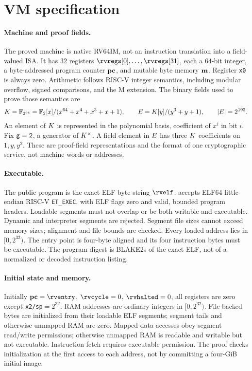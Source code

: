 \section{VM specification}\label{sec:vm}

\paragraph{Machine and proof fields.} The proved machine is native RV64IM, not an instruction translation into a field-valued ISA. It has $32$ registers $\rvregs[0],\ldots,\rvregs[31]$, each a $64$-bit integer, a byte-addressed program counter $\mathbf{pc}$, and mutable byte memory $\mathbf{m}$. Register \texttt{x0} is always zero. Arithmetic follows RISC-V integer semantics, including modular overflow, signed comparisons, and the M extension. The binary fields used to prove those semantics are
\[
  K=\mathbb{F}_{2^{64}}=\mathbb{F}_2[x]/(x^{64}+x^4+x^3+x+1),
  \qquad E=K[y]/(y^3+y+1),\qquad |E|=2^{192}.
\]
An element of $K$ is represented in the polynomial basis, coefficient of $x^i$ in bit $i$. Fix $\mathsf{g}=\mathtt{2}$, a generator of $K^\times$. A field element in $E$ has three $K$ coefficients on $1,y,y^2$. These are proof-field representations and the format of one cryptographic service, not machine words or addresses.

\paragraph{Executable.} The public program is the exact ELF byte string $\rvelf$.  accepts ELF64 little-endian RISC-V \texttt{ET\_EXEC}, with ELF flags zero and valid, bounded program headers. Loadable segments must not overlap or be both writable and executable. Dynamic and interpreter segments are rejected. Segment file sizes cannot exceed memory sizes; alignment and file bounds are checked. Every loaded address lies in $[0,2^{32})$. The entry point is four-byte aligned and its four instruction bytes must be executable. The program digest is BLAKE2s of the exact ELF, not of a normalized or decoded instruction listing.

\paragraph{Initial state and memory.} Initially $\pc=\rventry$, $\rvcycle=0$, $\rvhalted=0$, all registers are zero except \texttt{x2/sp}$=2^{32}$. RAM addresses are ordinary integers in $[0,2^{32})$. File-backed bytes are initialized from their loadable ELF segments; segment tails and otherwise unmapped RAM are zero. Mapped data accesses obey segment read/write permissions; otherwise unmapped RAM is readable and writable but not executable. Instruction fetch requires executable permission. The proof checks initialization at the first access to each address, not by committing a four-GiB initial image.

